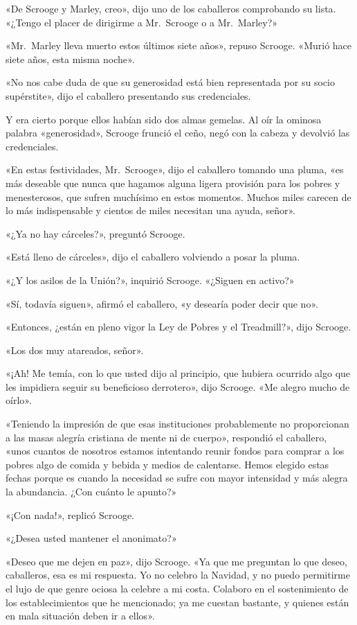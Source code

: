 \documentclass{novela}
\begin{document}
 «De Scrooge y Marley, creo», dijo uno de los caballeros comprobando su lista. «¿Tengo el placer de dirigirme a Mr.~Scrooge o a Mr.~Marley?»

 «Mr.~Marley lleva muerto estos últimos siete años», repuso Scrooge. «Murió hace siete años, esta misma noche».

 «No nos cabe duda de que su generosidad está bien representada por su socio supérstite», dijo el caballero presentando sus credenciales.

 Y era cierto porque ellos habían sido dos almas gemelas. Al oír la ominosa palabra «generosidad», Scrooge frunció el ceño, negó con la cabeza y devolvió las credenciales.

 «En estas festividades, Mr.~Scrooge», dijo el caballero tomando una pluma, «es más deseable que nunca que hagamos alguna ligera provisión para los pobres y menesterosos, que sufren muchísimo en estos momentos. Muchos miles carecen de lo más indispensable y cientos de miles necesitan una ayuda, señor».

 «¿Ya no hay cárceles?», preguntó Scrooge.

 «Está lleno de cárceles», dijo el caballero volviendo a posar la pluma.

 «¿Y los asilos de la Unión?», inquirió Scrooge. «¿Siguen en activo?»

 «Sí, todavía siguen», afirmó el caballero, «y desearía poder decir que no».

 «Entonces, ¿están en pleno vigor la Ley de Pobres y el Treadmill?», dijo Scrooge.

 «Los dos muy atareados, señor».

 «¡Ah! Me temía, con lo que usted dijo al principio, que hubiera ocurrido algo que les impidiera seguir su beneficioso derrotero», dijo Scrooge. «Me alegro mucho de oírlo».

 «Teniendo la impresión de que esas instituciones probablemente no proporcionan a las masas alegría cristiana de mente ni de cuerpo», respondió el caballero, «unos cuantos de nosotros estamos intentando reunir fondos para comprar a los pobres algo de comida y bebida y medios de calentarse. Hemos elegido estas fechas porque es cuando la necesidad se sufre con mayor intensidad y más alegra la abundancia. ¿Con cuánto le apunto?»

 «¡Con nada!», replicó Scrooge.

 «¿Desea usted mantener el anonimato?»

 «Deseo que me dejen en paz», dijo Scrooge. «Ya que me preguntan lo que deseo, caballeros, esa es mi respuesta. Yo no celebro la Navidad, y no puedo permitirme el lujo de que genre ociosa la celebre a mi costa. Colaboro en el sostenimiento de los establecimientos que he mencionado; ya me cuestan bastante, y quienes están en mala situación deben ir a ellos».
\end{document}
